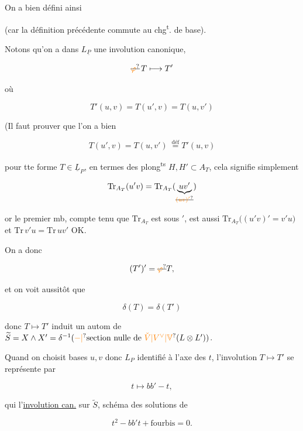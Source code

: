  On a bien défini ainsi


(car la définition précédente commute
au chg\textsuperscript{t}. de base).

Notons qu'on a dans $L_{\underline P}$ une involution
canonique,

\[
\deleted{\unsure{\varphi}}\,T\longmapsto T'
\]

où

\[
T'(u,v)=T(u',v)=T(u,v')
\]

(Il faut prouver que l'on a bien

\[
\boxed{T(u',v)=T(u,v')}\ \overset{\mathrm{déf}}{=}T'(u,v)
\]

pour tte forme $T\in\underline L_P$,  en
termes des plong\textsuperscript{ts} $H,H'\subset A_T$,
cela signifie simplement

\[
\mathrm{Tr}_{A_T}(u'v)=\mathrm{Tr}_{A_T}(\underbrace{uv'}_{\deleted{\unsure{(uv)'}}})
\]

or le premier mb, compte tenu que
$\mathrm{Tr}_{A_T}$ est  sous $'$, est aussi
$\mathrm{Tr}_{A_T}\bigl((u'v)'=v'u\bigr)$ et $\mathrm{Tr}\,v'u=\mathrm{Tr}\,uv'$ OK.

On a donc

\[
(T')'=\deleted{\unsure{\varphi}}T,
\]

et on voit aussitôt que


\[
\delta(T)=\delta(T')
\]

donc $T\mapsto T'$ induit un  autom
de $\widetilde S=X\wedge X'=\delta^{-1}(\unsure{-|{}}\text{section nulle de }\unsure{\check V|V^\vee|\mathbb V}(L\otimes L'))$.

Quand on choisit bases $u,v$ donc
$L_P$ identifié à l'axe des $t$, l'involution
$T\mapsto T'$  se représente par

\[
t\longmapsto bb'-t,
\]

qui   l'\uline{involution can.} sur $\widetilde S$, schéma
des solutions de

\[
t^2-bb't+\text{fourbis}=0.
\]

